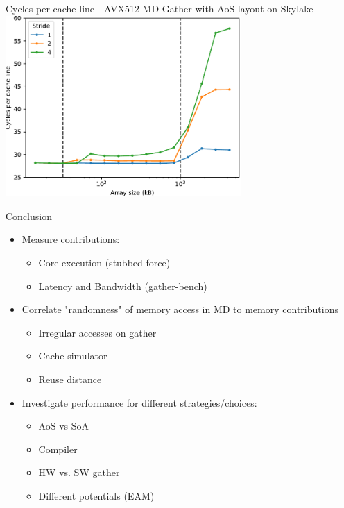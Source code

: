 \documentclass[aspectratio=169,t]{beamer}
\begin{document}
  \begin{frame}[fragile]{Cycles per cache line - AVX512 MD-Gather with AoS layout on Skylake}
    \includegraphics[width=9cm]{gather_md_skylakesp2_results_1_2_4.pdf}
  \end{frame}

  \begin{frame}[fragile]{Conclusion}
    \begin{itemize}
      \item Measure contributions:
      \begin{itemize}
        \item Core execution (stubbed force)
        \item Latency and Bandwidth (gather-bench)
      \end{itemize}
      \item Correlate "randomness" of memory access in MD to memory contributions
      \begin{itemize}
        \item Irregular accesses on gather
        \item Cache simulator
        \item Reuse distance
      \end{itemize}
      \item Investigate performance for different strategies/choices:
      \begin{itemize}
        \item AoS vs SoA
        \item Compiler
        \item HW vs. SW gather
        \item Different potentials (EAM)
      \end{itemize}
    \end{itemize}
  \end{frame}
\end{document}
